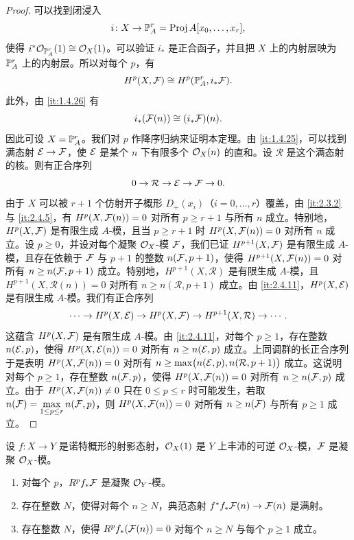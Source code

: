 \begin{proof}
可以找到闭浸入
\[
i\colon X\to\mathbb{P}^r_A=\operatorname{Proj} A[x_0,\dots,x_r],
\]
使得 $i^{*}\mathcal{O}_{\mathbb{P}^r_A}(1)\cong\mathcal{O}_X(1)$。可以验证 $i_*$ 是正合函子，并且把 $X$ 上的内射层映为 $\mathbb{P}^r_A$ 上的内射层。所以对每个 $p$，有
\[
H^p(X,\mathcal{F})\cong H^p(\mathbb{P}^r_A,i_*\mathcal{F}).
\]
此外，由 \ref{it:1.4.26} 有
\[
i_*(\mathcal{F}(n))\cong(i_*\mathcal{F})(n).
\]
因此可设 $X=\mathbb{P}^r_A$。我们对 $p$ 作降序归纳来证明本定理。由 \ref{it:1.4.25}，可以找到满态射 $\mathcal{E}\to\mathcal{F}$，使 $\mathcal{E}$ 是某个 $n$ 下有限多个 $\mathcal{O}_X(n)$ 的直和。设 $\mathcal{R}$ 是这个满态射的核。则有正合序列
\[
0\to\mathcal{R}\to\mathcal{E}\to\mathcal{F}\to 0.
\]
由于 $X$ 可以被 $r+1$ 个仿射开子概形 $D_+(x_i)$（$i=0,\dots,r$）覆盖，由 \ref{it:2.3.2} 与 \ref{it:2.4.5}，有 $H^p(X,\mathcal{F}(n))=0$ 对所有 $p\ge r+1$ 与所有 $n$ 成立。特别地，$H^p(X,\mathcal{F})$ 是有限生成 $A$-模，且当 $p\ge r+1$ 时 $H^p(X,\mathcal{F}(n))=0$ 对所有 $n$ 成立。设 $p\ge 0$，并设对每个凝聚 $\mathcal{O}_X$-模 $\mathcal{F}$，我们已证 $H^{p+1}(X,\mathcal{F})$ 是有限生成 $A$-模，且存在依赖于 $\mathcal{F}$ 与 $p+1$ 的整数 $n(\mathcal{F},p+1)$，使得 $H^{p+1}(X,\mathcal{F}(n))=0$ 对所有 $n\ge n(\mathcal{F},p+1)$ 成立。特别地，$H^{p+1}(X,\mathcal{R})$ 是有限生成 $A$-模，且 $H^{p+1}(X,\mathcal{R}(n))=0$ 对所有 $n\ge n(\mathcal{R},p+1)$ 成立。由 \ref{it:2.4.11}，$H^p(X,\mathcal{E})$ 是有限生成 $A$-模。我们有正合序列
\[
\cdots\to H^p(X,\mathcal{E})\to H^p(X,\mathcal{F})\to H^{p+1}(X,\mathcal{R})\to\cdots.
\]
这蕴含 $H^p(X,\mathcal{F})$ 是有限生成 $A$-模。由 \ref{it:2.4.11}，对每个 $p\ge 1$，存在整数 $n(\mathcal{E},p)$，使得 $H^p(X,\mathcal{E}(n))=0$ 对所有 $n\ge n(\mathcal{E},p)$ 成立。上同调群的长正合序列于是表明 $H^p(X,\mathcal{F}(n))=0$ 对所有 $n\ge\max\bigl(n(\mathcal{E},p),n(\mathcal{R},p+1)\bigr)$ 成立。这说明对每个 $p\ge 1$，存在整数 $n(\mathcal{F},p)$，使得 $H^p(X,\mathcal{F}(n))=0$ 对所有 $n\ge n(\mathcal{F},p)$ 成立。由于 $H^p(X,\mathcal{F}(n))\ne0$ 只在 $0\le p\le r$ 时可能发生，若取 $n(\mathcal{F})=\max\limits_{1\le p\le r}n(\mathcal{F},p)$，则 $H^p(X,\mathcal{F}(n))=0$ 对所有 $n\ge n(\mathcal{F})$ 与所有 $p\ge 1$ 成立。
\end{proof}

\begin{corollary}\label{it:2.4.13}
设 $f\colon X\to Y$ 是诺特概形的射影态射，$\mathcal{O}_X(1)$ 是 $Y$ 上丰沛的可逆 $\mathcal{O}_X$-模，$\mathcal{F}$ 是凝聚 $\mathcal{O}_X$-模。
\begin{enumerate}[label=(\roman*),leftmargin=2.2em]
  \item 对每个 $p$，$R^pf_*\mathcal{F}$ 是凝聚 $\mathcal{O}_Y$-模。
  \item 存在整数 $N$，使得对每个 $n\ge N$，典范态射 $f^{*}f_*\mathcal{F}(n)\to\mathcal{F}(n)$ 是满射。
  \item 存在整数 $N$，使得 $R^pf_*(\mathcal{F}(n))=0$ 对每个 $n\ge N$ 与每个 $p\ge 1$ 成立。
\end{enumerate}
\end{corollary}

